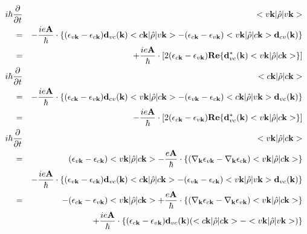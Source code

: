 \documentclass[aps,prb,preprint]{revtex4-1}
\begin{document}
\begin{appendix}
\begin{eqnarray}
i \hbar \frac{ \partial }{\partial t } &&<v{\bf k}| \hat{\rho} |v{\bf k}> \nonumber \\
=&& -\frac{ie{\bf A}}{\hbar} \cdot  \{ (\epsilon_{v{\bf k}}-\epsilon_{c{\bf k}}) {\bf d}_{vc}({\bf k}) <c{\bf k}| \hat{\rho} |v{\bf k}>  -  (\epsilon_{c{\bf k}}-\epsilon_{v{\bf k}})<v{\bf k}| \hat{\rho} |c{\bf k}> {\bf d}_{cv}({\bf k}) \nonumber \} \\
=&& +\frac{ie{\bf A}}{\hbar} \cdot [2 (\epsilon_{c{\bf k}}-\epsilon_{v{\bf k}}) {\bf Re}\{ {\bf d}_{vc}^*({\bf k}) <v{\bf k}| \hat{\rho} |c{\bf k}> \} ] \\
%
i \hbar \frac{ \partial }{\partial t } &&<c{\bf k}| \hat{\rho} |c{\bf k}> \nonumber \\
=&& -\frac{ie{\bf A}}{\hbar} \cdot \{ (\epsilon_{c{\bf k}}-\epsilon_{v{\bf k}}) {\bf d}_{cv}({\bf k}) <v{\bf k}| \hat{\rho} |c{\bf k}>  -  (\epsilon_{v{\bf k}}-\epsilon_{c{\bf k}})<c{\bf k}| \hat{\rho} |v{\bf k}> {\bf d}_{vc}({\bf k}) \} \nonumber \\
=&& -\frac{ie{\bf A}}{\hbar} \cdot [ 2 (\epsilon_{c{\bf k}}-\epsilon_{v{\bf k}}) {\bf Re}\{ {\bf d}_{vc}^*({\bf k}) <v{\bf k}| \hat{\rho} |c{\bf k}> \} ] \\
%
i \hbar \frac{ \partial }{\partial t } &&<v{\bf k}| \hat{\rho} |c{\bf k}> \nonumber \\
= && (\epsilon_{v{\bf k}}-\epsilon_{c{\bf k}}) <v{\bf k}| \hat{\rho} |c{\bf k}>  -\frac{e{\bf A}}{\hbar} \cdot \{ (\nabla_{\bf k} \epsilon_{v{\bf k}} - \nabla_{\bf k} \epsilon_{c{\bf k}}) <v{\bf k}| \hat{\rho} |c{\bf k}> \} \nonumber  \\
&& -\frac{ie{\bf A}}{\hbar} \cdot  \{ (\epsilon_{v{\bf k}}-\epsilon_{c{\bf k}}) {\bf d}_{vc}({\bf k}) <c{\bf k}| \hat{\rho} |c{\bf k}>  -  (\epsilon_{v{\bf k}}-\epsilon_{c{\bf k}})<v{\bf k}| \hat{\rho} |v{\bf k}> {\bf d}_{vc}({\bf k}) \} \nonumber \\
= && - (\epsilon_{c{\bf k}}-\epsilon_{v{\bf k}}) <v{\bf k}| \hat{\rho} |c{\bf k}>  + \frac{e{\bf A}}{\hbar} \cdot \{ (\nabla_{\bf k} \epsilon_{c{\bf k}} - \nabla_{\bf k} \epsilon_{v{\bf k}}) <v{\bf k}| \hat{\rho} |c{\bf k}> \} \nonumber  \\
&& + \frac{ie{\bf A}}{\hbar} \cdot  \{ (\epsilon_{c{\bf k}}-\epsilon_{v{\bf k}}) {\bf d}_{vc}({\bf k}) ( <c{\bf k}| \hat{\rho} |c{\bf k}> - <v{\bf k}| \hat{\rho} |v{\bf k}> ) \}
\end{eqnarray}


\end{appendix}
\end{document}
